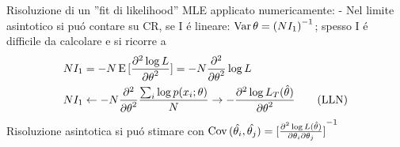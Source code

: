 \documentclass[asd-beamer.tex]{subfiles}
\begin{document}
\begin{frame}{Risoluzione di un ''fit di likelihood''}\frameintoc
MLE applicato numericamente:  - Nel limite asintotico si pu\'o contare su CR, se I \'e lineare: $\operatorname{Var}{\theta}={(NI_1)}^{-1}$; spesso I \'e difficile da calcolare e si ricorre a
\begin{align*}
&NI_1=-N\operatorname{E}{[\frac{\partial^2 \log{L}}{{\partial \theta}^2}]}=-N\frac{\partial^2}{{\partial \theta}^2}\log{L}\\
&NI_1\gets-N\frac{\partial^2}{{\partial \theta}^2}\frac{\sum_i\log{p(x_i;\theta)}}{N}\to-\frac{\partial^2 \log{L_T(\hat{\theta})}}{{\partial \theta}^2}\tag{LLN}
\end{align*}
Risoluzione asintotica si pu\'o stimare con $\operatorname{Cov}{(\hat{\theta_i},\hat{\theta_j})}={[\frac{\partial^2\log{L(\hat{\theta})}}{\partial\theta_i\partial\theta_j}]}^{-1}$
\end{frame}

\end{document}
